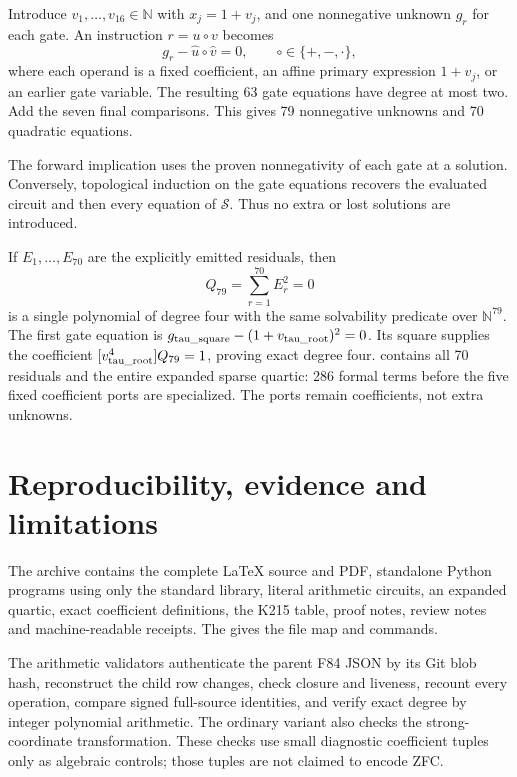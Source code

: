 \documentclass[11pt,a4paper]{article}
\theoremstyle{definition}\newtheorem{definition}[theorem]{Definition}
\newcommand{\N}{\mathbb N}
\newcommand{\file}[1]{\texttt{\detokenize{#1}}}
\begin{document}
Introduce $v_1,\ldots,v_{16}\in\N$ with $x_j=1+v_j$, and one
nonnegative unknown $g_r$ for each gate. An instruction $r=u\circ v$
becomes
\[
 g_r-\widehat u\circ\widehat v=0,
 \qquad\circ\in\{+,-,\cdot\},
\]
where each operand is a fixed coefficient, an affine primary expression
$1+v_j$, or an earlier gate variable. The resulting 63 gate equations
have degree at most two. Add the seven final comparisons. This gives
79 nonnegative unknowns and 70 quadratic equations.

The forward implication uses the proven nonnegativity of each gate
at a solution. Conversely, topological induction on the gate equations
recovers the evaluated circuit and then every equation of
$\mathcal S$. Thus no extra or lost solutions are introduced.

If $E_1,\ldots,E_{70}$ are the explicitly emitted residuals, then
\begin{equation}\label{eq:quartic}
 Q_{79}=\sum_{r=1}^{70}E_r^2=0
\end{equation}
is a single polynomial of degree four with the same solvability
predicate over $\N^{79}$. The first gate equation is
$g_{\rm tau\_square}-(1+v_{\rm tau\_root})^2=0$.
Its square supplies the coefficient
$[v_{\rm tau\_root}^4]Q_{79}=1$, proving exact degree four.
\file{quadratic_lift.json} contains all 70 residuals and the entire
expanded sparse quartic: 286 formal terms before the five fixed
coefficient ports are specialized. The ports remain coefficients,
not extra unknowns.

\section{Reproducibility, evidence and limitations}\label{sec:repro}
The archive contains the complete \LaTeX{} source and PDF, standalone
Python programs using only the standard library, literal arithmetic
circuits, an expanded quartic, exact coefficient definitions, the
K215 table, proof notes, review notes and machine-readable receipts.
The \file{README.md} gives the file map and commands.

The arithmetic validators authenticate the parent F84 JSON by its Git
blob hash, reconstruct the child row changes, check closure and
liveness, recount every operation, compare signed full-source
identities, and verify exact degree by integer polynomial arithmetic.
The ordinary variant also checks the strong-coordinate transformation.
These checks use small diagnostic coefficient tuples only as algebraic
controls; those tuples are not claimed to encode ZFC.
\end{document}
